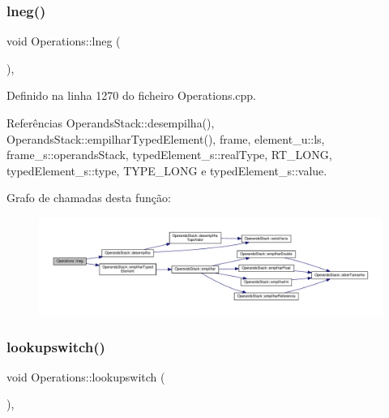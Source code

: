 \subsubsection{\texorpdfstring{lneg()}{lneg()}}
{\footnotesize\ttfamily void Operations\+::lneg (\begin{DoxyParamCaption}{ }\end{DoxyParamCaption})\hspace{0.3cm}{\ttfamily [static]}, {\ttfamily [private]}}



Definido na linha 1270 do ficheiro Operations.\+cpp.



Referências Operands\+Stack\+::desempilha(), Operands\+Stack\+::empilhar\+Typed\+Element(), frame, element\+\_\+u\+::ls, frame\+\_\+s\+::operands\+Stack, typed\+Element\+\_\+s\+::real\+Type, R\+T\+\_\+\+L\+O\+NG, typed\+Element\+\_\+s\+::type, T\+Y\+P\+E\+\_\+\+L\+O\+NG e typed\+Element\+\_\+s\+::value.

Grafo de chamadas desta função\+:\nopagebreak
\begin{figure}[H]
\begin{center}
\leavevmode
\includegraphics[width=350pt]{classOperations_a0a14cc7ee880b5d5f1c3b532e8e2117c_cgraph}
\end{center}
\end{figure}
\mbox{\label{classOperations_a0458ee466daff63a3698973c89cfe71a}} 
\subsubsection{\texorpdfstring{lookupswitch()}{lookupswitch()}}
{\footnotesize\ttfamily void Operations\+::lookupswitch (\begin{DoxyParamCaption}{ }\end{DoxyParamCaption})\hspace{0.3cm}{\ttfamily [static]}, {\ttfamily [private]}}



